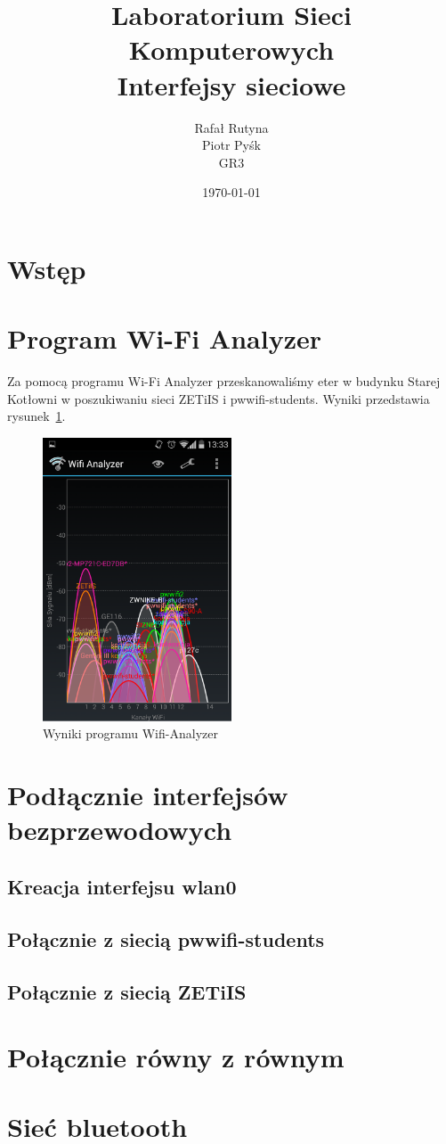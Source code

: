 \documentclass[a4paper,11pt,notitlepage]{article}
\author{Rafał Rutyna \\ Piotr Pyśk \\ GR3}
\title{Laboratorium Sieci Komputerowych \\ {\small Interfejsy sieciowe}}
\date{\today}
\begin{document}
\maketitle
\newpage
\tableofcontents
\newpage

\section{Wstęp}

\section{Program Wi-Fi Analyzer}

Za pomocą programu Wi-Fi Analyzer przeskanowaliśmy eter w budynku Starej 
Kotłowni w poszukiwaniu sieci ZETiIS i pwwifi-students.
Wyniki przedstawia rysunek~\ref{wifi-analyzer}.

\begin{figure}[htb]
  \centering
  \includegraphics[width=0.5\textwidth]{analyzer.png}
  \caption{Wyniki programu Wifi-Analyzer}
  \label{wifi-analyzer}
\end{figure}


\section{Podłącznie interfejsów bezprzewodowych}

\subsection{Kreacja interfejsu wlan0}

\subsection{Połącznie z siecią pwwifi-students}

\subsection{Połącznie z siecią ZETiIS}

\section{Połącznie równy z równym}

\section{Sieć bluetooth} 
\end{document}
